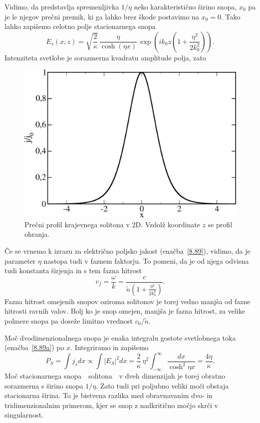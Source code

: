 Vidimo, da predstavlja spremenljivka $1/\eta$ neko karakteristično širino snopa, $x_{0}$ pa
je le njegov prečni premik, ki ga lahko brez škode postavimo na $x_0=0$. Tako
lahko zapišemo celotno polje stacionarnega snopa 
\begin{equation}
E_{s}(x,z)=\sqrt{\frac{2}{\kappa}}\,\frac{\eta}{\cosh(\eta x)}\,\exp\left(ik_{0}z\left(1+
\frac{\eta^{2}}{2k_{0}^{2}}\right)\right).
\label{8.89}
\end{equation}
Intenziteta svetlobe je sorazmerna kvadratu amplitude polja, zato 
\begin{figure}[h]
\centering
\includegraphics[width=8truecm]{slike/08_soliton.png}
\caption{Prečni profil krajevnega solitona v 2D. Vzdolž koordinate $z$ se profil ohranja.}
\label{fig:soliton}
\end{figure}

Če se vrnemo k izrazu za električno poljsko jakost (enačba~\ref{8.89}), vidimo, da
je parameter $\eta$ nastopa tudi v faznem faktorju. To pomeni, da je od njega odvisna 
tudi konstanta širjenja in s tem fazna hitrost
\begin{equation}
v_{f}=\frac{\omega}{k} = \frac{c}{\tilde{n}\left(1+\frac{\eta^{2}}{2k_{0}^{2}}\right)}.
\end{equation}
Fazna hitrost omejenih snopov oziroma solitonov je torej vedno manjša od fazne hitrosti ravnih valov. 
Bolj ko je snop omejen, manjša je fazna hitrost, za velike polmere snopa pa doseže 
limitno vrednost $c_0/\tilde{n}$.

Moč dvodimenzionalnega snopa je enaka integralu
gostote svetlobnega toka (enačba~\ref{8.89a}) po $x$. Integriramo in zapišemo 
\begin{equation}
P_S = \int j_s dx \propto \int |E_S|^2 dx  = 
\frac{2}{\kappa}\,\eta^{2}\int_{-\infty}^{\infty}\frac{dx}
{\cosh^{2}\eta x}=\frac{4\eta}{\kappa}.
\label{eq:solj}
\end{equation}
Moč stacionarnega snopa~\textendash~solitona~\textendash~v dveh dimenzijah je 
torej obratno sorazmerna s širino snopa $1/\eta$. Zato tudi pri poljubno veliki moči 
obstaja stacionarna širina. To je bistvena razlika med obravnavanim dvo- in 
tridimenzionalnim primerom, kjer se snop z nadkritično močjo skrči v singularnost.

